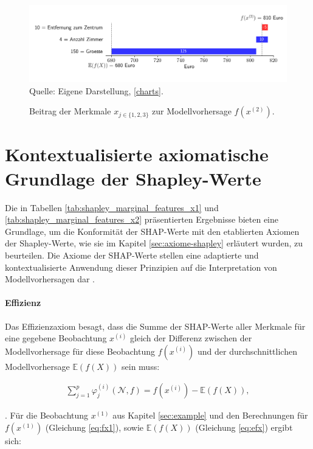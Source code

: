 \begin{figure}[!h]
    \caption{Beitrag der Merkmale $x_{j \in \{1, 2, 3\}}$ zur Modellvorhersage $f(x^{(2)})$.}
    \includegraphics[width=1\textwidth]{../scripts/images/model-output-x2.png}
    Quelle: Eigene Darstellung, \ref{charts}.
    \label{pic:model-fx2}
\end{figure}


\section{Kontextualisierte axiomatische Grundlage der Shapley-Werte}

Die in Tabellen \ref{tab:shapley_marginal_features_x1} und \ref{tab:shapley_marginal_features_x2} präsentierten Ergebnisse bieten eine Grundlage, 
um die Konformität der SHAP-Werte mit den etablierten Axiomen der Shapley-Werte, wie sie im 
Kapitel \ref{sec:axiome-shapley} erläutert wurden, zu beurteilen. Die Axiome der SHAP-Werte stellen 
eine adaptierte und kontextualisierte Anwendung dieser Prinzipien auf die Interpretation von 
Modellvorhersagen dar \cite[S. 16f]{Algaba2019HandbookOT}.


\paragraph{\rmfamily\bfseries Effizienz}

Das Effizienzaxiom besagt, dass die Summe der SHAP-Werte aller Merkmale für eine gegebene Beobachtung $x^{(i)}$ 
gleich der Differenz zwischen der Modellvorhersage für diese Beobachtung $f(x^{(i)})$ 
und der durchschnittlichen Modellvorhersage $\mathbb{E}(f(X))$ sein muss:

\begin{align}
    \sum_{j=1}^{p}\varphi_j^{(i)}(\mathcal{N}, f) = f(x^{(i)}) - \mathbb{E}(f(X)),
    \label{eq:eff}
\end{align}

\cite[S. 221]{Molnar_2022}. Für die Beobachtung $x^{(1)}$ aus Kapitel \ref{sec:example} und den Berechnungen 
für $f(x^{(1)})$ (Gleichung \ref{eq:fx1}), sowie $\mathbb{E}(f(X))$ (Gleichung \ref{eq:efx}) ergibt sich:

